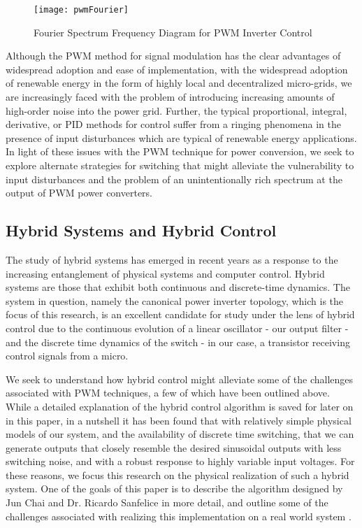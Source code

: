 \begin{figure}[h]
\centering
\texttt{[image: pwmFourier]}
\caption{Fourier Spectrum Frequency Diagram for PWM Inverter Control}
\label{pwmFourier}
\end{figure}

Although the PWM method for signal modulation has the clear advantages of widespread adoption and ease of implementation, with the widespread adoption of renewable energy in the form of highly local and decentralized micro-grids, we are increasingly faced with the problem of introducing increasing amounts of high-order noise into the power grid. Further, the typical proportional, integral, derivative, or PID methods for control suffer from a ringing phenomena in the presence of input disturbances which are typical of renewable energy applications. In light of these issues with the PWM technique for power conversion, we seek to explore alternate strategies for switching that might alleviate the vulnerability to  input disturbances and the problem of an unintentionally rich spectrum at the output of PWM power converters. 

\subsection{Hybrid Systems and Hybrid Control}
The study of hybrid systems has emerged in recent years as a response to the increasing entanglement of physical systems and computer control. 
Hybrid systems are those that exhibit both continuous and discrete-time dynamics. The system in question, namely the canonical power inverter topology, which is the focus of this research, is an excellent candidate for study under the lens of hybrid control due to the continuous evolution of a linear oscillator - our output filter - and the discrete time dynamics of the switch - in our case, a transistor receiving control signals from a micro. 

We seek to understand how hybrid control might alleviate some of the challenges associated with PWM techniques, a few of which have been outlined above. While a detailed explanation of the hybrid control algorithm is saved for later on in this paper, in a nutshell it has been found that with relatively simple physical models of our system, and the availability of discrete time switching, that we can generate outputs that closely resemble the desired sinusoidal outputs with less switching noise, and with a robust response to highly variable input voltages. For these reasons, we focus this research on the physical realization of such a hybrid system. One of the goals of this paper is to describe the algorithm designed by Jun Chai and Dr. Ricardo Sanfelice in more detail, and outline some of the challenges associated with realizing this implementation on a real world system \cite{ricardo}.

